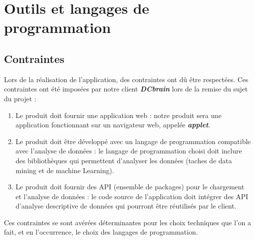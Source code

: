 	\section{Outils et langages de programmation}
		\subsection{Contraintes}
		Lors de la réalisation de l'application, des contraintes ont dû être respectées. Ces contraintes ont été imposées par notre client \textbf{\textit{DCbrain}} lors de la remise du sujet du projet :
		\begin{enumerate}[leftmargin=*]
			\item Le produit doit fournir une application web : notre produit sera une application fonctionnant sur un navigateur web, appelée \textbf{\textit{applet}}.
			\item Le produit doit être développé avec un langage de programmation compatible avec l'analyse de données : le langage de programmation choisi doit inclure des bibliothèques qui permettent d'analyser les données (taches de data mining et de machine Learning).
			\item Le produit doit fournir des API (ensemble de packages) pour le chargement et l'analyse de données : le code source de l'application doit intégrer des API d'analyse descriptive de données qui pourront être réutilisés par le client.
		\end{enumerate}	
		Ces contraintes se sont avérées déterminantes pour les choix techniques que l'on a fait, et en l'occurrence, le choix des langages de programmation. 
		
